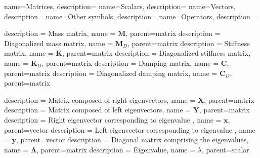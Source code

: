 
{
	name={{\Large Matrices\bigskip}}, 
	description={\nopostdesc}
}
{
	name={{\Large Scalars\bigskip}}, 
	description={\nopostdesc}
}
{
	name={{\Large Vectors\bigskip}}, 
	description={\nopostdesc}
}
{
	name={{\Large Other symbols\bigskip}}, 
	description={\nopostdesc}
}
{
	name={{\Large Operators\bigskip}}, 
	description={\nopostdesc}
}


{
	description = {Mass matrix}, 
	name = {\ensuremath{\mathbf{M}}},
	parent=matrix
}
{
	description = {Diagonalized mass matrix}, 
	name = {\ensuremath{\mathbf{M}_D}},
	parent=matrix
}
{
	description = {Stiffness matrix}, 
	name = {\ensuremath{\mathbf{K}}},
	parent=matrix
}
{
	description = {Diagonalized stiffness matrix}, 
	name = {\ensuremath{\mathbf{K}_D}},
	parent=matrix
}
{
	description = {Damping matrix}, 
	name = {\ensuremath{\mathbf{C}}},
	parent=matrix
}
{
	description = {Diagonalized damping matrix}, 
	name = {\ensuremath{\mathbf{C}_D}},
	parent=matrix
}


{
	description = {Matrix composed of right eigenvectors}, 
	name = {\ensuremath{\mathbf{X}}},
	parent=matrix
}
{
	description = {Matrix composed of left eigenvectors}, 
	name = {\ensuremath{\mathbf{Y}}},
	parent=matrix
}
{
	description = {Right eigenvector corresponding to eigenvalue }, 
	name = {\ensuremath{\mathbf{x}}},
	parent=vector
}
{
	description = {Left eigenvector corresponding to eigenvalue }, 
	name = {\ensuremath{\mathbf{y}}},
	parent=vector
}
{
	description = {Diagonal matrix comprising the eigenvalues}, 
	name = {\ensuremath{\mathbf{\Lambda}}},
	parent=matrix
}
{
	description = {Eigenvalue}, 
	name = {\ensuremath{\lambda}},
	parent=scalar
}

